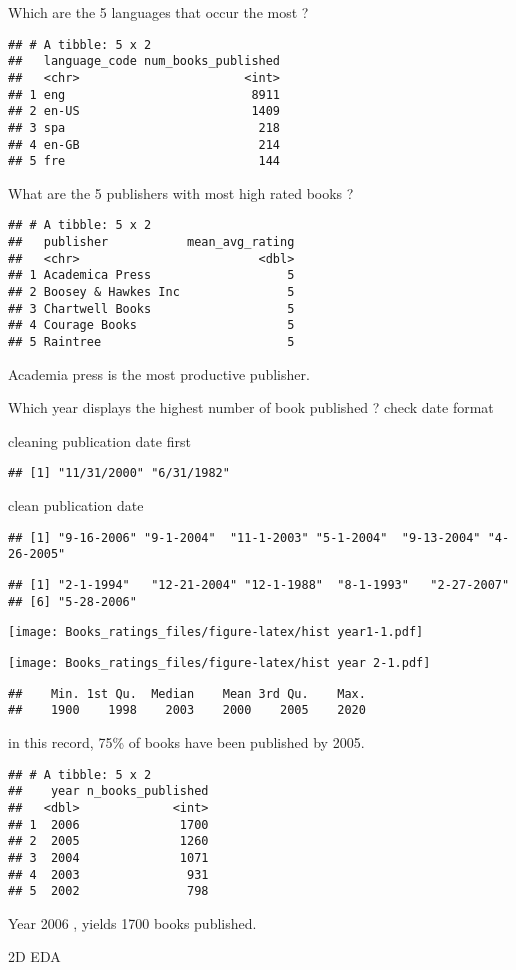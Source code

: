 \documentclass[
]{article}
\begin{document}
Which are the 5 languages that occur the most ?

\begin{verbatim}
## # A tibble: 5 x 2
##   language_code num_books_published
##   <chr>                       <int>
## 1 eng                          8911
## 2 en-US                        1409
## 3 spa                           218
## 4 en-GB                         214
## 5 fre                           144
\end{verbatim}

What are the 5 publishers with most high rated books ?

\begin{verbatim}
## # A tibble: 5 x 2
##   publisher           mean_avg_rating
##   <chr>                         <dbl>
## 1 Academica Press                   5
## 2 Boosey & Hawkes Inc               5
## 3 Chartwell Books                   5
## 4 Courage Books                     5
## 5 Raintree                          5
\end{verbatim}

Academia press is the most productive publisher.

Which year displays the highest number of book published ? check date
format

cleaning publication date first

\begin{verbatim}
## [1] "11/31/2000" "6/31/1982"
\end{verbatim}

clean publication date

\begin{verbatim}
## [1] "9-16-2006" "9-1-2004"  "11-1-2003" "5-1-2004"  "9-13-2004" "4-26-2005"
\end{verbatim}

\begin{verbatim}
## [1] "2-1-1994"   "12-21-2004" "12-1-1988"  "8-1-1993"   "2-27-2007" 
## [6] "5-28-2006"
\end{verbatim}

\texttt{[image: Books\_ratings\_files/figure-latex/hist year1-1.pdf]}

\texttt{[image: Books\_ratings\_files/figure-latex/hist year 2-1.pdf]}

\begin{verbatim}
##    Min. 1st Qu.  Median    Mean 3rd Qu.    Max. 
##    1900    1998    2003    2000    2005    2020
\end{verbatim}

in this record, 75\% of books have been published by 2005.

\begin{verbatim}
## # A tibble: 5 x 2
##    year n_books_published
##   <dbl>             <int>
## 1  2006              1700
## 2  2005              1260
## 3  2004              1071
## 4  2003               931
## 5  2002               798
\end{verbatim}

Year 2006 , yields 1700 books published.

2D EDA
\end{document}
